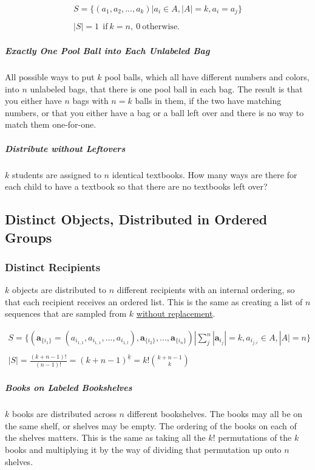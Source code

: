 \begin{equation}	
\begin{array}{l}
S = \{ (a_1,a_2,...,a_k) | a_i \in A, |A| = k, a_i=a_j\}\\
\\
|S| = 1\ \ \mathrm{if\ }k = n,\ 0\ \mathrm{otherwise.}
\end{array}
\end{equation}


\subparagraph{Exactly One Pool Ball into Each Unlabeled Bag} All possible ways to put $k$ pool balls, which all have different numbers and colors, into $n$ unlabeled bags, that there is one pool ball in each bag. The result is that you either have $n$ bags with $n=k$ balls in them, if the two have matching numbers, or that you either have a bag or a ball left over and there is no way to match them one-for-one.

\subparagraph{Distribute without Leftovers} $k$ students are assigned to $n$ identical textbooks. How many ways are there for each child to have a textbook so that there are no textbooks left over? 


\subsection{Distinct Objects, Distributed in Ordered Groups}

\subsubsection{Distinct Recipients}
$k$ objects are distributed to $n$ different recipients with an internal ordering, so that each recipient receives an ordered list. This is the same as creating a list of $n$ sequences that are sampled from $k$ \underline{without replacement}. 

\begin{equation}
\begin{array}{l}
S = \{ (\mathbf{a}_{\{i_1\}}  = ( a_{i_{1,1}},a_{i_{1,1}},...,a_{i_{1,l}} ),\mathbf{a}_{\{i_2\}},...,\mathbf{a}_{\{i_n\}}) | \sum^n_j |\mathbf{a}_{i_j}| = k, a_{i_{j,i}} \in A, |A| = n \} \\
\\
|S| = \frac{(k + n - 1)!}{(n-1)!} = ( k+n-1)^{\underline{k}} = k! {k+n-1 \choose k}
\end{array}
\end{equation}


\subparagraph{Books on Labeled Bookshelves} $k$ books are distributed across $n$ different bookshelves. The books may all be on the same shelf, or shelves may be empty. The ordering of the books on each of the shelves matters. This is the same as taking all the $k!$ permutations of the $k$ books and multiplying it by the way of dividing that permutation up onto $n$ shelves. 

